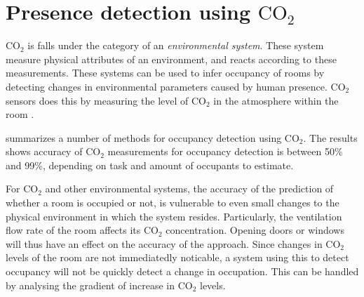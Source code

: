 \section{Presence detection using $\text{CO}_{2}$ }\label{sec:presence_env}
$\text{CO}_{2}$ is falls under the category of an \textit{environmental system}. 
These system measure physical attributes of an environment, and reacts according to these measurements.
These systems can be used to infer occupancy of rooms by detecting changes in environmental parameters caused by human presence.
$\text{CO}_{2}$ sensors does this by measuring the level of $\text{CO}_{2}$ in the atmosphere within the room \cite{longoAccurateOccupancyEstimation2019, gruberCO2SensorsOccupancy2014}.

\citeauthor{longoAccurateOccupancyEstimation2019}\cite{longoAccurateOccupancyEstimation2019} summarizes a number of methods for occupancy detection using $\text{CO}_{2}$. 
The results shows accuracy of $\text{CO}_{2}$ measurements for occupancy detection is between 50\% and 99\%, depending on task and amount of occupants to estimate.

For $\text{CO}_{2}$ and other environmental systems, the accuracy of the prediction of whether a room is occupied or not, is vulnerable to even small changes to the physical environment in which the system resides.\cite{gruberCO2SensorsOccupancy2014,longoAccurateOccupancyEstimation2019}
Particularly, the ventilation flow rate of the room affects its $\text{CO}_{2}$ concentration. Opening doors or windows will thus have an effect on the accuracy of the approach.
Since changes in $\text{CO}_{2}$ levels of the room are not immediatedly noticable, a system using this to detect occupancy will not be quickly detect a change in occupation.
This can be handled by analysing the gradient of increase in $\text{CO}_{2}$ levels\cite{gradient_co2}.
